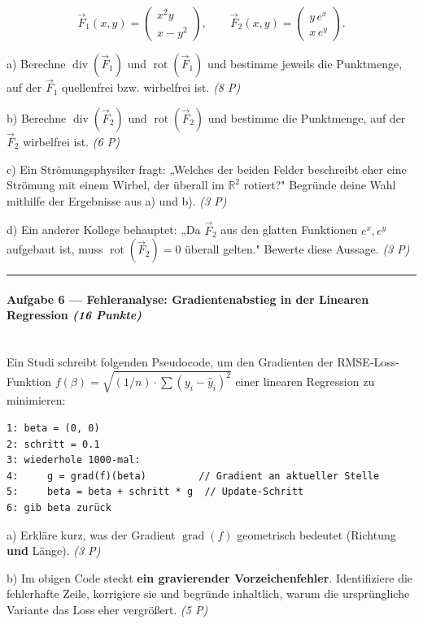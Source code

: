 \documentclass[11pt, a4paper]{article}
\begin{document}
\[
\vec{F}_1(x,y) = \begin{pmatrix} x^2 y \\ x - y^2 \end{pmatrix}, \qquad \vec{F}_2(x,y) = \begin{pmatrix} y\,e^x \\ x\,e^y \end{pmatrix}.
\]


a) Berechne $\operatorname{div}(\vec{F}_1)$ und $\operatorname{rot}(\vec{F}_1)$ und bestimme jeweils die Punktmenge, auf der $\vec{F}_1$ quellenfrei bzw. wirbelfrei ist. \textit{(8 P)}


b) Berechne $\operatorname{div}(\vec{F}_2)$ und $\operatorname{rot}(\vec{F}_2)$ und bestimme die Punktmenge, auf der $\vec{F}_2$ wirbelfrei ist. \textit{(6 P)}


c) Ein Strömungsphysiker fragt: „Welches der beiden Felder beschreibt eher eine Strömung mit einem Wirbel, der überall im $\mathbb{R}^2$ rotiert?" Begründe deine Wahl mithilfe der Ergebnisse aus a) und b). \textit{(3 P)}


d) Ein anderer Kollege behauptet: „Da $\vec{F}_2$ aus den glatten Funktionen $e^x, e^y$ aufgebaut ist, muss $\operatorname{rot}(\vec{F}_2) = 0$ überall gelten." Bewerte diese Aussage. \textit{(3 P)}



\noindent\textcolor{rulegray}{\rule{\linewidth}{0.4pt}}


\paragraph{Aufgabe 6 — Fehleranalyse: Gradientenabstieg in der Linearen Regression \textit{(16 Punkte)}}\mbox{}\\[2pt]

Ein Studi schreibt folgenden Pseudocode, um den Gradienten der RMSE-Loss-Funktion $f(\beta) = \sqrt{(1/n)\cdot \sum (y_i - \hat{y}_i)^2}$ einer linearen Regression zu minimieren:


\begin{lstlisting}
1: beta = (0, 0)
2: schritt = 0.1
3: wiederhole 1000-mal:
4:     g = grad(f)(beta)         // Gradient an aktueller Stelle
5:     beta = beta + schritt * g  // Update-Schritt
6: gib beta zurück
\end{lstlisting}


a) Erkläre kurz, was der Gradient $\operatorname{grad}(f)$ geometrisch bedeutet (Richtung \textbf{und} Länge). \textit{(3 P)}


b) Im obigen Code steckt \textbf{ein gravierender Vorzeichenfehler}. Identifiziere die fehlerhafte Zeile, korrigiere sie und begründe inhaltlich, warum die ursprüngliche Variante das Loss eher vergrößert. \textit{(5 P)}
\end{document}
